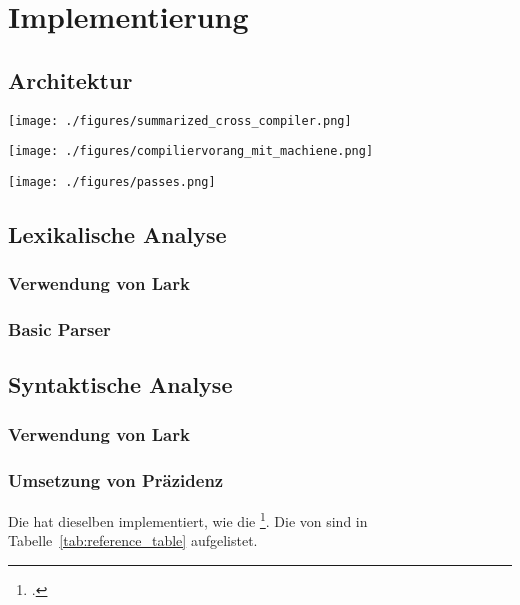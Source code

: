 
\chapter{Implementierung}
\label{ch:implementierung}
\section{Architektur}

{
  \centering
  \texttt{[image: ./figures/summarized\_cross\_compiler.png]}
}

{
  \centering
  \texttt{[image: ./figures/compiliervorang\_mit\_machiene.png]}
}

{
  \centering
  \texttt{[image: ./figures/passes.png]}
}

\section{Lexikalische Analyse}
\subsection{Verwendung von Lark}
\subsection{Basic Parser}
\section{Syntaktische Analyse}
\subsection{Verwendung von Lark}
\subsection{Umsetzung von Präzidenz}
Die  hat dieselben  implementiert, wie die  \footcite{noauthor_c_nodate}. Die  von  sind in Tabelle~\ref{tab:reference_table} aufgelistet.

